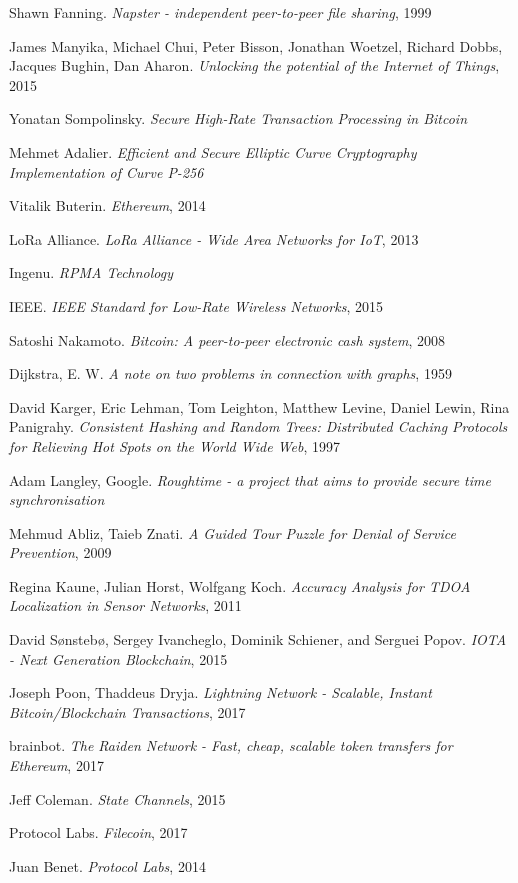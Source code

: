 \documentclass[10pt, nonatbib, nocopyrightspace, reprint]{sigplanconf}
\begin{document}
\begin{thebibliography}{10}
\softraggedright

    Shawn Fanning.
    \emph{Napster - independent peer-to-peer file sharing}, 1999

    James Manyika, Michael Chui, Peter Bisson, Jonathan Woetzel, Richard Dobbs, Jacques Bughin, Dan Aharon.
    \emph{Unlocking the potential of the Internet of Things}, 2015

    Yonatan Sompolinsky.
    \emph{Secure High-Rate Transaction Processing in Bitcoin}

    Mehmet Adalier.
    \emph{Efficient and Secure Elliptic Curve Cryptography Implementation of Curve P-256}

    Vitalik Buterin.
    \emph{Ethereum}, 2014

    LoRa Alliance.
    \emph{LoRa Alliance - Wide Area Networks for IoT}, 2013

    Ingenu.
    \emph{RPMA Technology}

    IEEE.
    \emph{IEEE Standard for Low-Rate Wireless Networks}, 2015

    Satoshi Nakamoto.
    \emph{Bitcoin: A peer-to-peer electronic cash system}, 2008

    Dijkstra, E. W.
    \emph{A note on two problems in connection with graphs}, 1959

    David Karger, Eric Lehman, Tom Leighton, Matthew Levine, Daniel Lewin, Rina Panigrahy.
    \emph{Consistent Hashing and Random Trees: Distributed Caching Protocols for Relieving Hot Spots on the World Wide Web}, 1997

    Adam Langley, Google.
    \emph{Roughtime - a project that aims to provide secure time synchronisation}

    Mehmud Abliz, Taieb Znati.
    \emph{A Guided Tour Puzzle for Denial of Service Prevention}, 2009

    Regina Kaune, Julian Horst, Wolfgang Koch.
    \emph{Accuracy Analysis for TDOA Localization in Sensor Networks}, 2011

    David Sønstebø, Sergey Ivancheglo, Dominik Schiener, and Serguei Popov.
    \emph{IOTA - Next Generation Blockchain}, 2015

    Joseph Poon, Thaddeus Dryja.
    \emph{Lightning Network - Scalable, Instant Bitcoin/Blockchain Transactions}, 2017

    brainbot.
    \emph{The Raiden Network - Fast, cheap, scalable token transfers for Ethereum}, 2017

    Jeff Coleman.
    \emph{State Channels}, 2015

    Protocol Labs.
    \emph{Filecoin}, 2017

    Juan Benet.
    \emph{Protocol Labs}, 2014

\end{thebibliography}
\end{document}
